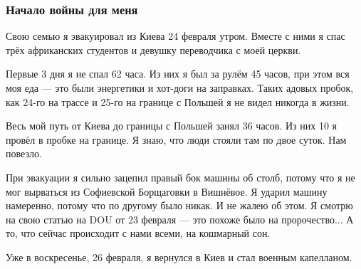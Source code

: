  
 
 
 
 

\subsubsection{Начало войны для меня}

Свою семью я эвакуировал из Киева 24 февраля утром. Вместе с ними я спас трёх
африканских студентов и девушку переводчика с моей церкви.

Первые 3 дня я не спал 62 часа. Из них я был за рулём 45 часов, при этом вся
моя еда — это были энергетики и хот-доги на заправках. Таких адовых пробок, как
24-го на трассе и 25-го на границе с Польшей я не видел никогда в жизни.

Весь мой путь от Киева до границы с Польшей занял 36 часов. Из них 10 я провёл
в пробке на границе. Я знаю, что люди стояли там по двое суток. Нам повезло.

При эвакуации я сильно зацепил правый бок машины об столб, потому что я не мог
вырваться из Софиевской Борщаговки в Вишнёвое. Я ударил машину намеренно,
потому что по другому было никак. И не жалею об этом. Я смотрю на свою статью
на DOU от 23 февраля — это похоже было на пророчество... А то, что сейчас
происходит с нами всеми, на кошмарный сон.

Уже в воскресенье, 26 февраля, я вернулся в Киев и стал военным капелланом.
